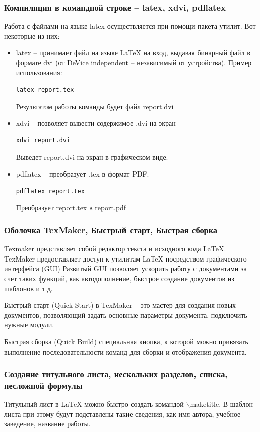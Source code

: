 \documentclass[12pt,a4paper]{article}
\begin{document}
\subsubsection{Компиляция в командной строке – latex, xdvi, pdflatex}
Работа с файлами на языке latex осуществляется при помощи пакета утилит. Вот некоторые из них:
\begin{itemize}
\item latex -- принимает файл на языке \LaTeX{} на вход, выдавая бинарный файл в формате dvi (от DeVice independent -- независимый от устройства). Пример использования:
\begin{Verbatim}[xleftmargin=.5in,fontsize=\small]
latex report.tex
\end{Verbatim}

Результатом работы команды будет файл report.dvi
\item xdvi -- позволяет вывести содержимое .dvi на экран
\begin{Verbatim}[xleftmargin=.5in,fontsize=\small]
xdvi report.dvi
\end{Verbatim}
Выведет report.dvi на экран в графическом виде.
\item pdflatex -- преобразует .tex в формат PDF.
\begin{Verbatim}[xleftmargin=.5in,fontsize=\small]
pdflatex report.tex
\end{Verbatim}
Преобразует report.tex в report.pdf
\end{itemize}
\subsubsection{Оболочка TexMaker, Быстрый старт, Быстрая сборка}
Texmaker представляет собой редактор текста и исходного кода LaTeX. TexMaker предоставляет доступ к утилитам LaTeX посредством графического интерфейса (GUI) Развитый GUI позволяет ускорить работу с документами за счет таких функций, как автодополнение, быстрое создание документов из шаблонов и т.д.

Быстрый старт (Quick Start) в TexMaker -- это мастер для создания новых документов, позволяющий задать основные параметры документа, подключить нужные модули.

Быстрая сборка (Quick Build) специальная кнопка, к которой можно привязать выполнение последовательности команд для сборки и отображения документа. 
\subsubsection{Создание титульного листа, нескольких разделов, списка, несложной формулы}
Титульный лист в LaTeX можно быстро создать командой $\backslash$maketitle. В шаблон листа при этому будут подставлены такие сведения, как имя автора, учебное заведение, название работы.
 
\end{document}
